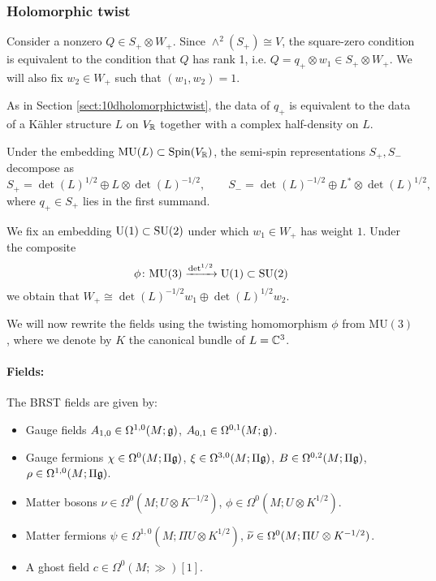 \documentclass[10pt, oneside]{article}
\newcommand{\MU}{\mathrm{MU}}
\renewcommand{\U}{\mathrm{U}}
\begin{document}
\subsubsection{Holomorphic twist}

Consider a nonzero $Q\in S_+\otimes W_+$. Since $\wedge^2(S_+)\cong V$, the square-zero condition is equivalent to the condition that $Q$ has rank 1, i.e. $Q=q_+\otimes w_1\in S_+\otimes W_+$. We will also fix $w_2\in W_+$ such that $(w_1, w_2) = 1$.

As in Section \ref{sect:10dholomorphictwist}, the data of $q_+$ is equivalent to the data of a K\"ahler structure $L$ on $V_\mathbb R$ together with a complex half-density on $L$.

Under the embedding $\MU(L)\subset \Spin(V_\RR)$, the semi-spin representations $S_+, S_-$ decompose as
\[S_+ = \det(L)^{1/2}\oplus L\otimes \det(L)^{-1/2},\qquad S_- = \det(L)^{-1/2} \oplus L^*\otimes \det(L)^{1/2},\]
where $q_+\in S_+$ lies in the first summand.

We fix an embedding $\U(1)\subset \SU(2)$ under which $w_1\in W_+$ has weight $1$. Under the composite
\[\phi\colon\MU(3)\xrightarrow{\det^{1/2}}\U(1)\subset \SU(2)\]
we obtain that $W_+\cong \det(L)^{-1/2} w_1\oplus \det(L)^{1/2} w_2$.

We will now rewrite the fields using the twisting homomorphism $\phi$ from $\MU(3)$, where we denote by $K$ the canonical bundle of $L=\mathbb C^3$.

\vspace{-10pt}
\paragraph{Fields:} The BRST fields are given by:
\begin{itemize}
\item Gauge fields $A_{1, 0} \in \Omega^{1, 0}(M; \mathfrak g)$, $A_{0, 1}\in\Omega^{0, 1}(M; \mathfrak g)$.
\item Gauge fermions $\chi\in\Omega^0(M; \Pi\mathfrak g)$, $\xi\in\Omega^{3, 0}(M; \Pi\mathfrak g)$, $B\in\Omega^{0, 2}(M; \Pi\mathfrak g)$, $\rho\in\Omega^{1, 0}(M; \Pi\mathfrak g)$.
\item Matter bosons $\nu\in\Omega^0(M; U\otimes K^{-1/2})$, $\phi\in\Omega^0(M; U\otimes K^{1/2})$.
\item Matter fermions $\psi\in \Omega^{1, 0}(M; \Pi U\otimes K^{1/2})$, $\widetilde{\nu}\in\Omega^0(M; \Pi U\otimes K^{-1/2})$.
\item A ghost field $c\in \Omega^0(M; \gg)[1]$.
\end{itemize}
\end{document}

